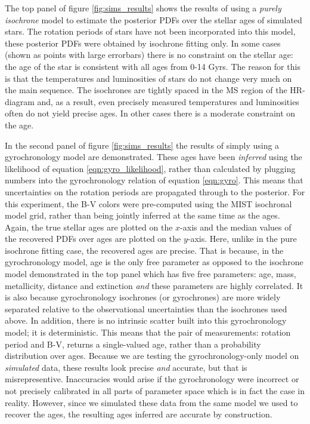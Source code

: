 The top panel of figure \ref{fig:sims_results} shows the results of using a
{\it purely isochrone} model to estimate the posterior PDFs over the
stellar ages of simulated stars.
The rotation periods of stars have not been incorporated into this model,
these posterior PDFs were obtained by isochrone fitting only.
In some cases (shown as points with large errorbars) there is no constraint on
the stellar age: the age of the star is consistent with all ages from 0-14
Gyrs.
The reason for this is that the temperatures and luminosities of stars do not
change very much on the main sequence.
The isochrones are tightly spaced in the MS region of the HR-diagram and, as a
result, even precisely measured temperatures and luminosities often do not
yield precise ages.
In other cases there is a moderate constraint on the age.

In the second panel of figure \ref{fig:sims_results} the results of simply
using a gyrochronology model are demonstrated.
These ages have been {\it inferred} using the likelihood of equation
\ref{eqn:gyro_likelihood}, rather than calculated by plugging numbers into the
gyrochronology relation of equation \ref{eqn:gyro}.
This means that uncertainties on the rotation periods are propagated through
to the posterior.
For this experiment, the B-V colors were pre-computed using the MIST
isochronal model grid, rather than being jointly inferred at the same time as
the ages.
Again, the true stellar ages are plotted on the $x$-axis and the median values
of the recovered PDFs over ages are plotted on the $y$-axis.
Here, unlike in the pure isochrone fitting case, the recovered ages are
precise.
That is because, in the gyrochronology model, age is the only free parameter
as opposed to the isochrone model demonstrated in the top panel which has five
free parameters: age, mass, metallicity, distance and extinction {\it and}
these parameters are highly correlated.
It is also because gyrochronology isochrones (or gyrochrones) are more widely
separated relative to the observational uncertainties than the isochrones used
above.
In addition, there is no intrinsic scatter built into this gyrochronology
model; it is deterministic.
This means that the pair of measurements: rotation period and B-V, returns a
single-valued age, rather than a probability distribution over ages.
Because we are testing the gyrochronology-only model on {\it simulated} data,
these results look precise {\it and} accurate, but that is misrepresentive.
Inaccuracies would arise if the gyrochronology were incorrect or not precisely
calibrated in all parts of parameter space which is in fact the case in
reality.
However, since we simulated these data from the same model we used to recover
the ages, the resulting ages inferred are accurate by construction.

